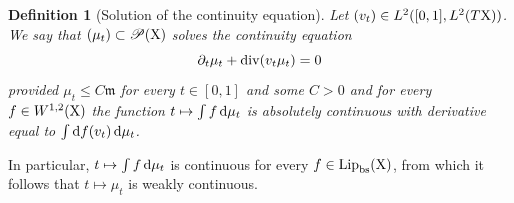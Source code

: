 \documentclass[11pt]{article}
\numberwithin{equation}{section}
\newtheorem{definition}[theorem]{Definition}
\newcommand{\pr}{\mathscr P}
\newcommand{\X}{{\rm X}}
\newcommand{\mm}{{\mathfrak m}}
\renewcommand{\d}{{\rm d}}
\renewcommand{\div}{{\rm div}}
\newcommand{\Lip}{{\rm Lip}}
\newcommand{\bs}{{\rm bs}}
\begin{document}
\begin{definition}[Solution of the continuity equation]\label{def:solCE} Let $(v_t)\in L^2([0,1],L^2(T\X))$.
We say that $(\mu_t)\subset \pr(\X)$ solves the continuity equation
\begin{equation}
\label{eq:CE}
\partial_t\mu_t+\div(v_t\mu_t)=0
\end{equation}
provided $\mu_t\leq C\mm$ for every $t\in[0,1]$ and some $C>0$   and for every $f\in W^{1,2}(\X)$ the function $t\mapsto \int f\,\d\mu_t$ is absolutely continuous with derivative equal to $\int \d f(v_t)\,\d\mu_t$.   
\end{definition}
In particular, $t\mapsto\int f\,\d\mu_t$ is continuous for every $f\in \Lip_\bs(\X)$, from which it follows that $t\mapsto\mu_t$ is weakly continuous. 
\end{document}
